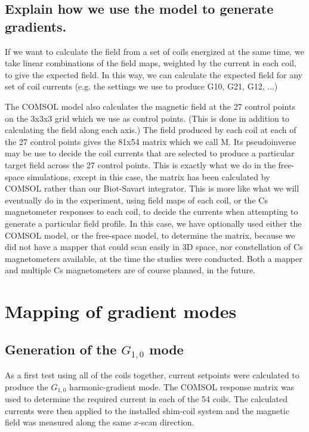 \documentclass[preprint,12pt]{elsarticle}
\begin{document}
\subsection{Explain how we use the model to generate gradients.}

If we want to calculate the field from a set of
coils energized at the same time, we take linear combinations of the
field maps, weighted by the current in each coil, to give the expected
field.  In this way, we can calculate the expected field for any set
of coil currents (e.g. the settings we use to produce G10, G21, G12,
...)

The COMSOL model also calculates the magnetic field at the 27 control
points on the 3x3x3 grid which we use as control points.  (This is
done in addition to calculating the field along each axis.)  The field
produced by each coil at each of the 27 control points gives the 81x54
matrix which we call M.  Its pseudoinverse may be use to decide the
coil currents that are selected to produce a particular target field
across the 27 control points.  This is exactly what we do in the
free-space simulations, except in this case, the matrix has been
calculated by COMSOL rather than our Biot-Savart integrator.  This is
more like what we will eventually do in the experiment, using field
maps of each coil, or the Cs magnetometer responses to each coil, to
decide the currents when attempting to generate a particular field
profile.  In this case, we have optionally used either the COMSOL
model, or the free-space model, to determine the matrix, because we
did not have a mapper that could scan easily in 3D space, nor
constellation of Cs magnetometers available, at the time the studies
were conducted.  Both a mapper and multiple Cs magnetometers are of
course planned, in the future.

\section{Mapping of gradient modes}

\subsection{Generation of the $G_{1,0}$ mode}
\label{sec:g10}

As a first test using all of the coils together, current setpoints were
calculated to produce the $G_{1,0}$ harmonic-gradient mode. The COMSOL
response matrix was used to determine the required current in each of
the 54 coils. The calculated currents were then applied to the
installed shim-coil system and the magnetic field was measured along
the same $x$-scan direction.
\end{document}
